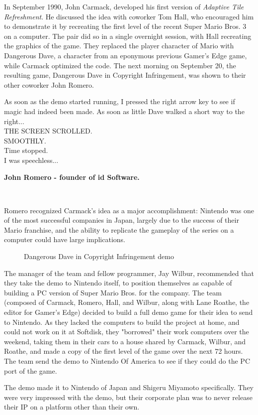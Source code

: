 \documentclass[book.tex]{subfiles}
\begin{document}
In September 1990, John Carmack, developed his first version of \textit{Adaptive Tile Refreshment}. He discussed the idea with coworker Tom Hall, who encouraged him to demonstrate it by recreating the first level of the recent Super Mario Bros. 3 on a computer. The pair did so in a single overnight session, with Hall recreating the graphics of the game. They replaced the player character of Mario with Dangerous Dave, a character from an eponymous previous Gamer's Edge game, while Carmack optimized the code. The next morning on September 20, the resulting game, Dangerous Dave in Copyright Infringement, was shown to their other coworker John Romero. \\

\par
\begin{fancyquotes}
As soon as the demo started running, I pressed the right arrow key to see if magic had indeed been made. As soon as little Dave walked a short way to the right...\\

THE SCREEN SCROLLED.\\

SMOOTHLY.\\

Time stopped.\\

I was speechless...\\
\par
\textbf{John Romero - founder of id Software.}
\end{fancyquotes}\\
\par



Romero recognized Carmack's idea as a major accomplishment: Nintendo was one of the most successful companies in Japan, largely due to the success of their Mario franchise, and the ability to replicate the gameplay of the series on a computer could have large implications.\\

\begin{figure}[H]
\centering
 \caption{Dangerous Dave in Copyright Infringement demo}
 \label{fig:ddici}
\end{figure}

\par
The manager of the team and fellow programmer, Jay Wilbur, recommended that they take the demo to Nintendo itself, to position themselves as capable of building a PC version of Super Mario Bros. for the company. The team (composed of Carmack, Romero, Hall, and Wilbur, along with Lane Roathe, the editor for Gamer's Edge) decided to build a full demo game for their idea to send to Nintendo. As they lacked the computers to build the project at home, and could not work on it at Softdisk, they "borrowed" their work computers over the weekend, taking them in their cars to a house shared by Carmack, Wilbur, and Roathe, and made a copy of the first level of the game over the next 72 hours. The team send the demo to Nintendo Of America to see if they could do the PC port of the game. \\

\par
The demo made it to Nintendo of Japan and Shigeru Miyamoto specifically. They were very impressed with the demo, but their corporate plan was to never release their IP on a platform other than their own.\\
\end{document}
